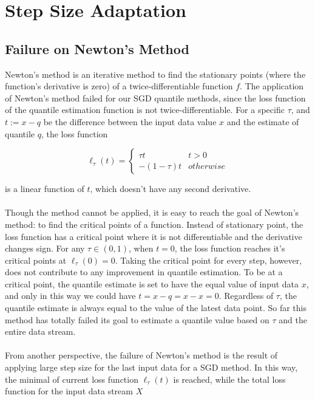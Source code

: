 \chapter{Step Size Adaptation}
\label{ch: SAG}

\graphicspath{{Figures/Stepsize_adapt/}{./}} 

\section{Failure on Newton's Method}
Newton's method is an iterative method to find the stationary points (where the function's derivative is zero) of a twice-differentiable function $f$. The application of Newton's method failed for our SGD quantile methods, since the loss function of the quantile estimation function is not twice-differentiable. For a specific $\tau$, and $t := x - q$ be the difference between the input data value $x$ and the estimate of quantile $q$, the loss function 

\begin{equation}
    \ell_\tau(t)= 
        \begin{cases}
            \tau t & t > 0\\
            -(1-\tau) t & otherwise
        \end{cases}
\end{equation}


is a linear function of $t$, which doesn't have any second derivative. 
\\\\
Though the method cannot be applied, it is easy to reach the goal of Newton's method: to find the critical points of a function. Instead of stationary point, the loss function has a critical point where it is not differentiable and the derivative changes sign. For any $\tau \in (0,1)$, when $t=0$, the loss function reaches it's critical points at $\ell_\tau(0) = 0$. Taking the critical point for every step, however, does not contribute to any improvement in quantile estimation. To be at a critical point, the quantile estimate is set to have the equal value of input data $x$, and only in this way we could have $t = x-q = x-x = 0$. Regardless of $\tau$, the quantile estimate is always equal to the value of the latest data point. So far this method has totally failed its goal to estimate a quantile value based on $\tau$ and the entire data stream.
\\\\
From another perspective, the failure of Newton's method is the result of applying large step size for the last input data for a SGD method. In this way, the minimal of current loss function $\ell_\tau(t)$ is reached, while the total loss function for the input data stream $X$

